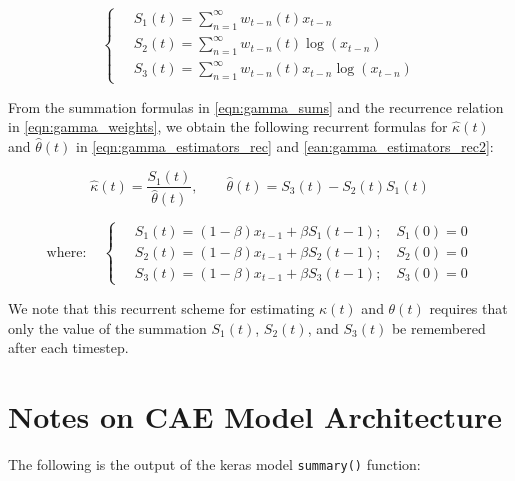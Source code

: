 \documentclass[12pt]{article}
\begin{document}
\begin{equation}
\begin{cases}
\quad S_1(t) = \sum_{n=1}^\infty w_{t-n}(t)x_{t-n} \\
\quad S_2(t) = \sum_{n=1}^\infty w_{t-n}(t)\log(x_{t-n}) \\
\quad S_3(t) = \sum_{n=1}^\infty w_{t-n}(t)x_{t-n}\log(x_{t-n}) 
\end{cases}
\label{eqn:gamma_sums}
\end{equation}

\noindent From the summation formulas in \eqref{eqn:gamma_sums} and the recurrence relation in \eqref{eqn:gamma_weights}, we obtain the following recurrent formulas for $\hat{\kappa}(t)$ and $\hat{\theta}(t)$ in \eqref{eqn:gamma_estimators_rec} and \eqref{ean:gamma_estimators_rec2}:


\begin{equation}
\hat{\kappa}(t) = \frac{S_1(t)}{\hat{\theta}(t)},\qquad \hat{\theta}(t) = S_3(t) - S_2(t)S_1(t)
\label{eqn:gamma_estimators_rec}
\end{equation}

\begin{equation}
\text{where}: \quad \begin{cases}
\quad S_1(t) = (1-\beta)x_{t-1} + \beta S_1(t-1) ;\quad S_1(0) = 0\\
\quad S_2(t) = (1-\beta)x_{t-1} + \beta S_2(t-1) ;\quad S_2(0) = 0 \\
\quad S_3(t) = (1-\beta)x_{t-1} + \beta S_3(t-1) ;\quad S_3(0) = 0
\end{cases}
\label{eqn:gamma_estimators_rec2}
\end{equation}

We note that this recurrent scheme for estimating $\kappa(t)$ and $\theta(t)$ requires that only the value of the summation $S_1(t)$, $S_2(t)$, and $S_3(t)$ be remembered after each timestep.


\section{Notes on CAE Model Architecture}\label{appendix:cae}

The following is the output of the keras model \texttt{summary()} function:
\end{document}
